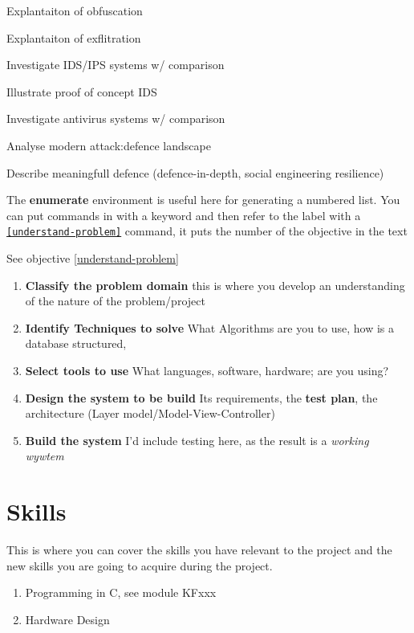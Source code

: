 Explantaiton of obfuscation

Explantaiton of exflitration

Investigate IDS/IPS systems w/ comparison

Illustrate proof of concept IDS

Investigate antivirus systems w/ comparison

Analyse modern attack:defence landscape

Describe meaningfull defence (defence-in-depth, social engineering resilience)


The \textbf{enumerate} environment is useful here for generating a numbered list.   You can put \texttt{\label{}} commands in with a keyword \texttt{\label{understand-problem}} and then refer to the label with a \texttt{\ref{understand-problem}} command, it puts the number of the objective in the text
\begin{tcblisting}{ }
	See objective \ref{understand-problem}
\end{tcblisting}
\begin{enumerate}
	\item \textbf{Classify the problem domain}\label{understand-problem}  this is where you develop an understanding of the nature of the problem/project
	\item \textbf{Identify Techniques to solve}  What Algorithms are you to use, how is a database structured,
	\item \textbf{Select tools to use}  What languages, software, hardware; are you using?
	\item \textbf{Design the system to be build}\label{write-code}  Its requirements, the \textbf{test plan}, the architecture (Layer model/Model-View-Controller)
	\item \textbf{Build the system}  I'd include testing here, as the result is a \emph{working wywtem}
\end{enumerate}

\section{Skills}
This is where you can cover the skills you have relevant to the project and the new skills you are going to acquire during the project.
\begin{enumerate}
	\item Programming in C, see module KFxxx
	\item Hardware Design
\end{enumerate}

